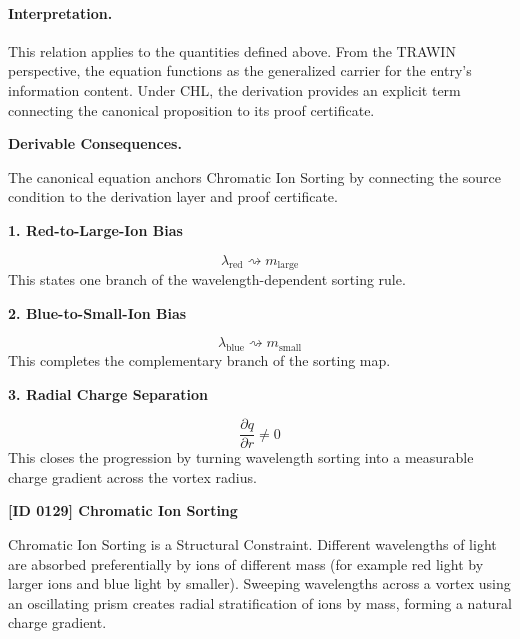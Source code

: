 \paragraph{Interpretation.}
This relation applies to the quantities defined above. From the TRAWIN perspective, the equation functions as the generalized carrier for the entry’s information content. Under CHL, the derivation provides an explicit term connecting the canonical proposition to its proof certificate.

\par\vspace{0.35em}
\noindent\textbf{Derivable Consequences.}\quad
\begingroup
\footnotesize
\raggedright
The canonical equation anchors Chromatic Ion Sorting by connecting the source condition to the derivation layer and proof certificate.
\par\endgroup

\noindent\textbf{1. Red-to-Large-Ion Bias}\par
\[
\lambda_{\mathrm{red}} \rightsquigarrow m_{\mathrm{large}}
\]
\noindent This states one branch of the wavelength-dependent sorting rule.\par
\noindent\textbf{2. Blue-to-Small-Ion Bias}\par
\[
\lambda_{\mathrm{blue}} \rightsquigarrow m_{\mathrm{small}}
\]
\noindent This completes the complementary branch of the sorting map.\par
\noindent\textbf{3. Radial Charge Separation}\par
\[
\frac{\partial q}{\partial r} \neq 0
\]
\noindent This closes the progression by turning wavelength sorting into a measurable charge gradient across the vortex radius.\par

\clearpage
\noindent\textbf{[ID 0129] Chromatic Ion Sorting}\par
\vspace{0.35em}
\begingroup\small
{}
Chromatic Ion Sorting is a Structural Constraint. Different wavelengths of light are absorbed preferentially by ions of different mass (for example red light by larger ions and blue light by smaller). Sweeping wavelengths across a vortex using an oscillating prism creates radial stratification of ions by mass, forming a natural charge gradient.

